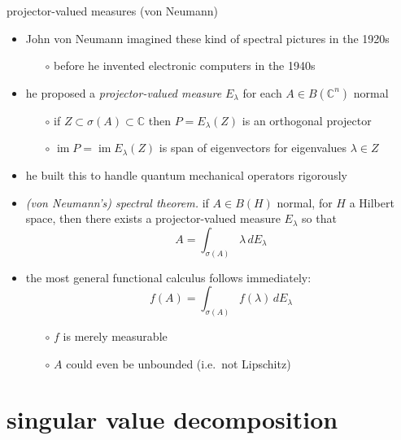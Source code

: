 \documentclass[10pt,hyperref]{beamer}
\newcommand{\CC}{\mathbb{C}}
\newcommand{\image}{\operatorname{im}}
\begin{document}
\begin{frame}{projector-valued measures (von Neumann)}

\begin{itemize}
\item John von Neumann imagined these kind of spectral pictures in the 1920s
    \begin{itemize}
    \item[$\circ$] before he invented electronic computers in the 1940s
    \end{itemize}
\item he proposed a \emph{projector-valued measure} $E_\lambda$ for each $A\in B(\CC^n)$ normal
    \begin{itemize}
    \item[$\circ$] if $Z\subset \sigma(A)\subset \CC$ then $P = E_\lambda(Z)$ is an orthogonal projector
    \item[$\circ$] $\image P = \image E_\lambda(Z)$ is span of eigenvectors for eigenvalues $\lambda \in Z$
    \end{itemize}
\item he built this to handle quantum mechanical operators rigorously
\item \emph{(von Neumann's) spectral theorem.} if $A\in B(H)$ normal, for $H$ a Hilbert space, then there exists a projector-valued measure $E_\lambda$ so that
    	$$A = \int_{\sigma(A)} \lambda\,dE_\lambda$$
\item the most general functional calculus follows immediately:
    	$$f(A) = \int_{\sigma(A)} f(\lambda)\,dE_\lambda$$
    \begin{itemize}
    \item[$\circ$] $f$ is merely measurable
    \item[$\circ$] $A$ could even be unbounded (i.e.~not Lipschitz)
    \end{itemize}
\end{itemize}
\end{frame}


\section{singular value decomposition}
\end{document}
